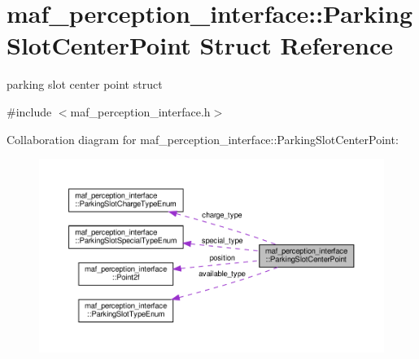 \hypertarget{structmaf__perception__interface_1_1ParkingSlotCenterPoint}{}\section{maf\+\_\+perception\+\_\+interface\+:\+:Parking\+Slot\+Center\+Point Struct Reference}
\label{structmaf__perception__interface_1_1ParkingSlotCenterPoint}


parking slot center point struct  




{\ttfamily \#include $<$maf\+\_\+perception\+\_\+interface.\+h$>$}



Collaboration diagram for maf\+\_\+perception\+\_\+interface\+:\+:Parking\+Slot\+Center\+Point\+:\nopagebreak
\begin{figure}[H]
\begin{center}
\leavevmode
\includegraphics[width=350pt]{structmaf__perception__interface_1_1ParkingSlotCenterPoint__coll__graph}
\end{center}
\end{figure}

